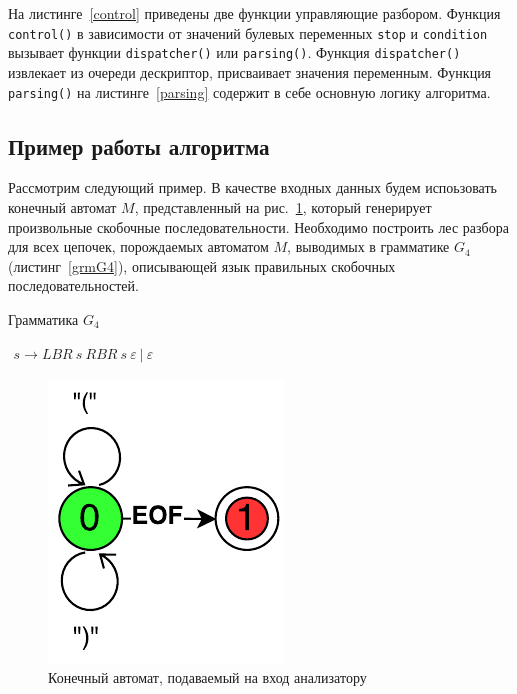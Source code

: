 На листинге~\ref{control} приведены две функции управляющие разбором. Функция \texttt{control()} в зависимости от значений булевых переменных \texttt{stop} и \texttt{condition} вызывает функции \texttt{dispatcher()} или \texttt{parsing()}. Функция \texttt{dispatcher()} извлекает из очереди дескриптор, присваивает значения переменным. Функция \texttt{parsing()} на листинге~\ref{parsing} содержит в себе основную логику алгоритма.


\subsection{Пример работы алгоритма}
Рассмотрим следующий пример. В качестве входных данных будем испоьзовать конечный автомат $M$, представленный на рис.~\ref{InputGraph}, который генерирует произвольные скобочные последовательности. Необходимо построить лес разбора для всех цепочек, порождаемых автоматом $M$, выводимых в грамматике $G_4$ (листинг~\ref{grmG4}), описывающей язык правильных скобочных последовательностей.
\begin{listing}
\caption{Грамматика $G_4$}
\label{grmG4}
\centering
$\begin{array}{rl}
s \rightarrow LBR \ s \ RBR \ s \ \varepsilon \  | \ \varepsilon 
\end{array}$
\end{listing}

\begin{figure}
 \centering
 \includegraphics[width=\textwidth]{Ragozina/pics/ExampleInputGraph.pdf}
 \caption{Конечный автомат, подаваемый на вход анализатору }
 \label{InputGraph}
\end{figure}

